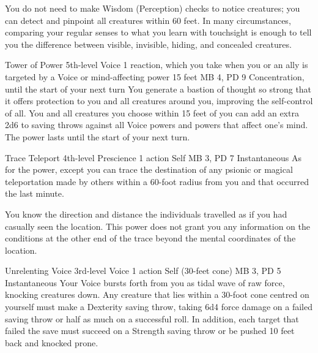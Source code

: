   You do not need to make Wisdom (Perception) checks
  to notice creatures; you can detect and pinpoint all creatures
  within 60 feet.
  In many circumstances, comparing your regular senses
  to what you learn with touchsight is enough to tell you
  the difference between visible, invisible, hiding,
  and concealed creatures.

\DndPowerHeader%
  {Tower of Power}
  {5th-level Voice}
  {1 reaction, which you take when you or an ally is
    targeted by a Voice or mind-affecting power}
  {15 feet}
  {MB 4, PD 9}
  {Concentration, until the start of your next turn}
  You generate a bastion of thought so strong
  that it offers protection to you and all creatures around you,
  improving the self-control of all.
  You and all creatures you choose within 15 feet of you
  can add an extra 2d6 to saving throws against all Voice powers
  and powers that affect one's mind.
  The power lasts until the start of your next turn.

\DndPowerHeader%
  {Trace Teleport}
  {4th-level Prescience}
  {1 action}
  {Self}
  {MB 3, PD 7}
  {Instantaneous}
  As for the  power,
  except you can trace the destination of any psionic
  or magical teleportation made by others within
  a 60-foot radius from you
  and that occurred the last minute.

  You know the direction and distance the individuals travelled
  as if you had casually seen the location.
  This power does not grant you any information on the conditions
  at the other end of the trace
  beyond the mental coordinates of the location.

\DndPowerHeader%
  {Unrelenting Voice}
  {3rd-level Voice}
  {1 action}
  {Self (30-feet cone)}
  {MB 3, PD 5}
  {Instantaneous}
Your Voice bursts forth from you as tidal wave of raw force,
knocking creatures down.
Any creature that lies within a 30-foot cone centred on yourself
must make a Dexterity saving throw,
taking 6d4 force damage on a failed saving throw or half as much on
a successful roll.
In addition, each target that failed the save
must succeed on a Strength saving throw or be pushed 10 feet back
and knocked prone.

